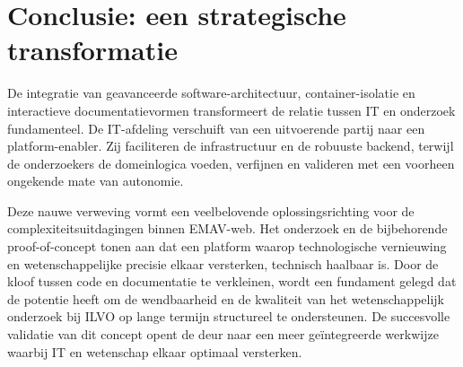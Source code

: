 \section{Conclusie: een strategische transformatie}
De integratie van geavanceerde software-architectuur, container-isolatie en interactieve documentatievormen transformeert de relatie tussen IT en onderzoek fundamenteel. De IT-afdeling verschuift van een uitvoerende partij naar een platform-enabler. Zij faciliteren de infrastructuur en de robuuste backend, terwijl de onderzoekers de domeinlogica voeden, verfijnen en valideren met een voorheen ongekende mate van autonomie.

Deze nauwe verweving vormt een veelbelovende oplossingsrichting voor de complexiteitsuitdagingen binnen EMAV-web. Het onderzoek en de bijbehorende proof-of-concept tonen aan dat een platform waarop technologische vernieuwing en wetenschappelijke precisie elkaar versterken, technisch haalbaar is. Door de kloof tussen code en documentatie te verkleinen, wordt een fundament gelegd dat de potentie heeft om de wendbaarheid en de kwaliteit van het wetenschappelijk onderzoek bij ILVO op lange termijn structureel te ondersteunen. De succesvolle validatie van dit concept opent de deur naar een meer geïntegreerde werkwijze waarbij IT en wetenschap elkaar optimaal versterken.
